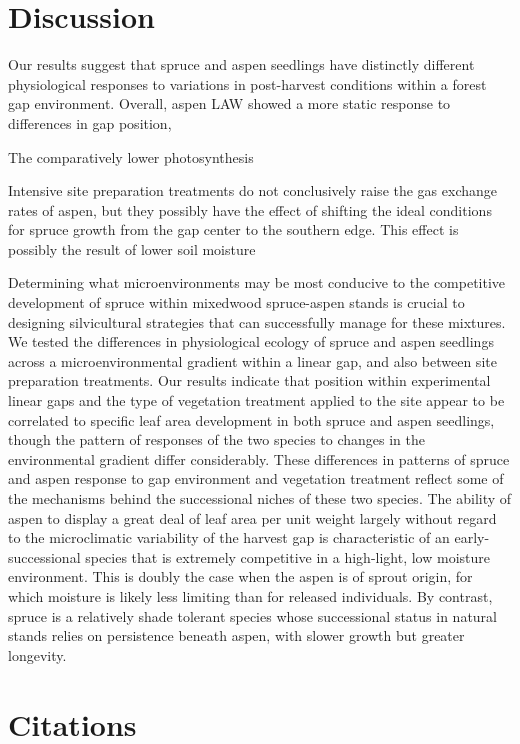 \documentclass{article}\usepackage[]{graphicx}\usepackage[]{color}
\begin{document}
\begin{multicols}{2}

\section{Discussion}
Our results suggest that spruce and aspen seedlings have distinctly different physiological responses to variations in post-harvest conditions within a forest gap environment. Overall, aspen LAW showed a more static response to differences in gap position, 

The comparatively lower photosynthesis 

Intensive site preparation treatments do not conclusively raise the gas exchange rates of aspen, but they possibly have the effect of shifting the ideal conditions for spruce growth from the gap center to the southern edge. This effect is possibly the result of lower soil moisture  

Determining what microenvironments may be most conducive to the competitive development of spruce within mixedwood spruce-aspen stands is crucial to designing silvicultural strategies that can successfully manage for these mixtures. We tested the differences in physiological ecology of spruce and aspen seedlings across a microenvironmental gradient within a linear gap, and also between site preparation treatments. Our results indicate that position within experimental linear gaps and the type of vegetation treatment applied to the site appear to be correlated to specific leaf area development in both spruce and aspen seedlings, though the pattern of responses of the two species to changes in the environmental gradient differ considerably. These differences in patterns of spruce and aspen response to gap environment and vegetation treatment reflect some of the mechanisms behind the successional niches of these two species. The ability of aspen to display a great deal of leaf area per unit weight largely without regard to the microclimatic variability of the harvest gap is characteristic of an early-successional species that is extremely competitive in a high-light, low moisture environment. This is doubly the case when the aspen is of sprout origin, for which moisture is likely less limiting than for released individuals. By contrast, spruce is a relatively shade tolerant species whose successional status in natural stands relies on persistence beneath aspen, with slower growth but greater longevity. 

\section{Citations}
\end{multicols}
\end{document}

